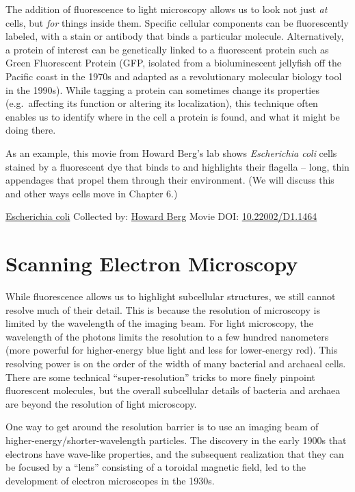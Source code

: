 \documentclass[]{tufte-book}
\begin{document}
The addition of fluorescence to light microscopy allows us to look not just \emph{at} cells, but \emph{for} things inside them. Specific cellular components can be fluorescently labeled, with a stain or antibody that binds a particular molecule. Alternatively, a protein of interest can be genetically linked to a fluorescent protein such as Green Fluorescent Protein (GFP, isolated from a bioluminescent jellyfish off the Pacific coast in the 1970s and adapted as a revolutionary molecular biology tool in the 1990s). While tagging a protein can sometimes change its properties (e.g.~affecting its function or altering its localization), this technique often enables us to identify where in the cell a protein is found, and what it might be doing there.

As an example, this movie from Howard Berg's lab \citep{bergInternet} \citep{turner2000} shows \emph{Escherichia coli} cells stained by a fluorescent dye that binds to and highlights their flagella -- long, thin appendages that propel them through their environment. (We will discuss this and other ways cells move in Chapter 6.)



\hypertarget{htmlwidget-7c178b533aec79b02af1}{}

\label{fig:1-2}\protect\hyperlink{tree}{Escherichia coli} Collected by: \protect\hyperlink{howard_berg}{Howard Berg} Movie DOI: \href{https://doi.org/10.22002/D1.1464}{10.22002/D1.1464}

\hypertarget{scanning-electron-microscopy}{%
\section{Scanning Electron Microscopy}\label{scanning-electron-microscopy}}

While fluorescence allows us to highlight subcellular structures, we still cannot resolve much of their detail. This is because the resolution of microscopy is limited by the wavelength of the imaging beam. For light microscopy, the wavelength of the photons limits the resolution to a few hundred nanometers (more powerful for higher-energy blue light and less for lower-energy red). This resolving power is on the order of the width of many bacterial and archaeal cells. There are some technical ``super-resolution'' tricks to more finely pinpoint fluorescent molecules, but the overall subcellular details of bacteria and archaea are beyond the resolution of light microscopy.

One way to get around the resolution barrier is to use an imaging beam of higher-energy/shorter-wavelength particles. The discovery in the early 1900s that electrons have wave-like properties, and the subsequent realization that they can be focused by a ``lens'' consisting of a toroidal magnetic field, led to the development of electron microscopes in the 1930s.
\end{document}
